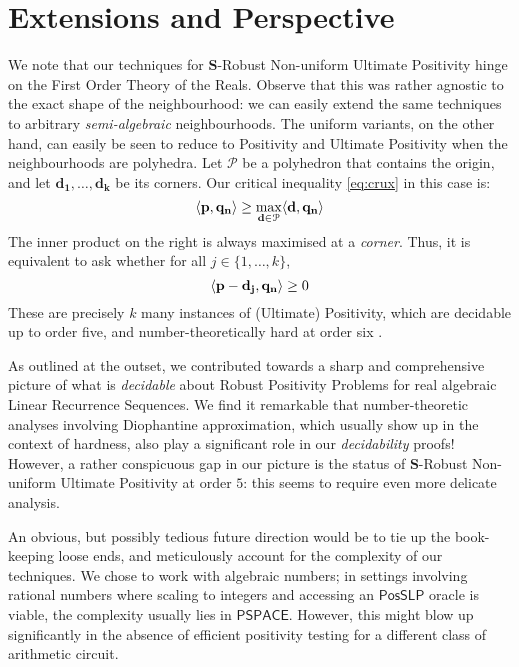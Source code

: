 \section{Extensions and Perspective}
We note that our techniques for $\mathbf{S}$-Robust Non-uniform Ultimate Positivity hinge on the First Order Theory of the Reals. Observe that this was rather agnostic to the exact shape of the neighbourhood: we can easily extend the same techniques to arbitrary \textit{semi-algebraic} neighbourhoods. The uniform variants, on the other hand, can easily be seen to reduce to Positivity and Ultimate Positivity when the neighbourhoods are polyhedra. Let $\mathcal{P}$ be a polyhedron that contains the origin, and let $\mathbf{d_1}, \dots, \mathbf{d_k}$ be its corners. Our critical inequality \ref{eq:crux} in this case is:
\begin{equation}
\langle\mathbf{p}, \mathbf{q_n}\rangle \ge \max_{\mathbf{d} \in \mathcal{P}} \langle\mathbf{d}, \mathbf{q_n}\rangle
\end{equation}
The inner product on the right is always maximised at a \textit{corner}. Thus, it is equivalent to ask whether for all $j \in \{1, \dots, k\}$,
\begin{equation}
\langle\mathbf{p} - \mathbf{d_j}, \mathbf{q_n}\rangle \ge 0
\end{equation}
These are precisely $k$ many instances of (Ultimate) Positivity, which are decidable up to order five, and number-theoretically hard at order six \cite{joeljames3}.

As outlined at the outset, we contributed towards a sharp and comprehensive picture of what is \textit{decidable} about Robust Positivity Problems for real algebraic Linear Recurrence Sequences. We find it remarkable that number-theoretic analyses involving Diophantine approximation, which usually show up in the context of hardness, also play a significant role in our \textit{decidability} proofs! However, a rather conspicuous gap in our picture is the status of $\mathbf{S}$-Robust Non-uniform Ultimate Positivity at order $5$: this seems to require even more delicate analysis. 

An obvious, but possibly tedious future direction would be to tie up the book-keeping loose ends, and meticulously account for the complexity of our techniques. We chose to work with algebraic numbers; in settings involving rational numbers where scaling to integers and accessing an $\mathsf{PosSLP}$ oracle is viable, the complexity usually lies in $\mathsf{PSPACE}$. However, this might blow up significantly in the absence of efficient positivity testing for a different class of arithmetic circuit.

